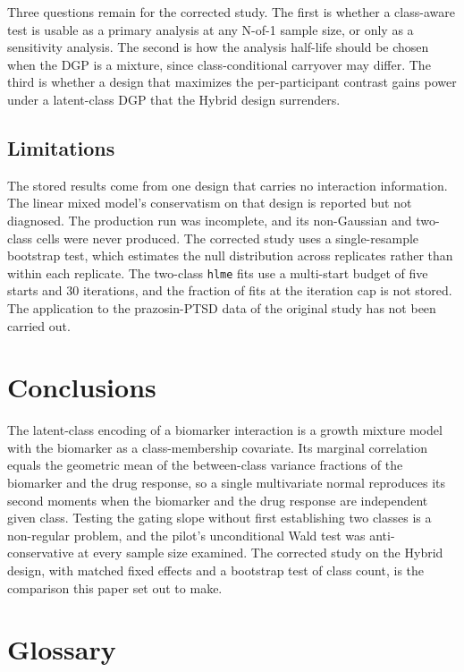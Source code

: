 \documentclass[
  11pt,
]{article}
\begin{document}
Three questions remain for the corrected study. The first is whether
a class-aware test is usable as a primary analysis at any N-of-1
sample size, or only as a sensitivity analysis. The second is how the
analysis half-life should be chosen when the DGP is a mixture, since
class-conditional carryover may differ. The third is whether a design
that maximizes the per-participant contrast gains power under a
latent-class DGP that the Hybrid design surrenders.

\subsection{Limitations}\label{limitations}

The stored results come from one design that carries no interaction
information. The linear mixed model's conservatism on that design is
reported but not diagnosed. The production run was incomplete, and
its non-Gaussian and two-class cells were never produced. The
corrected study uses a single-resample bootstrap test, which estimates
the null distribution across replicates rather than within each
replicate. The two-class \texttt{hlme} fits use a multi-start budget of five
starts and 30 iterations, and the fraction of fits at the iteration
cap is not stored. The application to the prazosin-PTSD data of the
original study has not been carried out.

\section{Conclusions}\label{conclusions}

The latent-class encoding of a biomarker interaction is a growth
mixture model with the biomarker as a class-membership covariate. Its
marginal correlation equals the geometric mean of the between-class
variance fractions of the biomarker and the drug response, so a
single multivariate normal reproduces its second moments when the
biomarker and the drug response are independent given class. Testing
the gating slope without first establishing two classes is a
non-regular problem, and the pilot's unconditional Wald test was
anti-conservative at every sample size examined. The corrected study
on the Hybrid design, with matched fixed effects and a bootstrap test
of class count, is the comparison this paper set out to make.

\section*{Glossary}\label{glossary}
\end{document}
